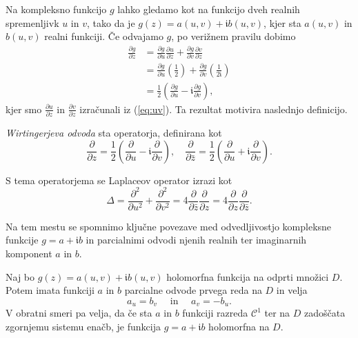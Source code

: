 \documentclass[fin1, tisk, bibtex]{fmfdelo}
\begin{document}
Na kompleksno funkcijo $g$ lahko gledamo kot na funkcijo dveh realnih spremenljivk $u$ in $v$, tako da je $g(z)=a(u, v)+\mathfrak{i} b(u, v)$, kjer sta $a(u, v)$ in $b(u, v)$ realni funkciji. Če odvajamo $g$, po verižnem pravilu dobimo
\begin{align*}
    \frac{\partial g}{\partial z} & =\frac{\partial g}{\partial u} \frac{\partial u}{\partial z}+\frac{\partial g}{\partial v} \frac{\partial v}{\partial z} \\
    & =\frac{\partial g}{\partial u}\left(\frac{1}{2}\right)+\frac{\partial g}{\partial v}\left(\frac{1}{2 \mathfrak{i}}\right) \\
    & =\frac{1}{2}\left(\frac{\partial g}{\partial u}-\mathfrak{i} \frac{\partial g}{\partial v}\right),
\end{align*}
kjer smo $\frac{\partial u}{\partial z}$ in $\frac{\partial v}{\partial z}$ izračunali iz (\ref{eq:uv}). Ta rezultat motivira naslednjo definicijo. 

\begin{definicija}
    \emph{Wirtingerjeva odvoda} sta operatorja, definirana kot
    \begin{equation*}
        \frac{\partial}{\partial z}=\frac{1}{2}\left(\frac{\partial}{\partial u}-\mathfrak{i} \frac{\partial}{\partial v}\right), \quad \frac{\partial}{\partial \bar{z}}=\frac{1}{2}\left(\frac{\partial}{\partial u}+\mathfrak{i} \frac{\partial}{\partial v}\right) .
    \end{equation*}
\end{definicija}

S tema operatorjema se Laplaceov operator izrazi kot 
\begin{equation*}
    \Delta=\frac{\partial^2}{\partial u^2}+\frac{\partial^2}{\partial v^2}=4 \frac{\partial}{\partial \bar{z}} \frac{\partial}{\partial z}=4 \frac{\partial}{\partial z} \frac{\partial}{\partial \bar{z}} .
\end{equation*}

Na tem mestu se spomnimo ključne povezave med odvedljivostjo kompleksne funkcije $g=a+\mathfrak{i} b$ in parcialnimi odvodi njenih realnih ter imaginarnih komponent $a$ in $b$.

\begin{trditev}
    Naj bo $g(z)=a(u, v)+\mathfrak{i} b(u, v)$ holomorfna funkcija na odprti množici $D$. Potem imata funkciji $a$ in $b$ parcialne odvode prvega reda na $D$ in velja
    \begin{equation*}
        a_u=b_v \quad \text { in } \quad a_v=-b_u .
    \end{equation*}
    V obratni smeri pa velja, da če sta $a$ in $b$ funkciji razreda $\mathcal{C}^1$ ter na $D$ zadoščata zgornjemu sistemu enačb, je funkcija $g=a+\mathfrak{i} b$ holomorfna na $D$.
\end{trditev}
\end{document}
